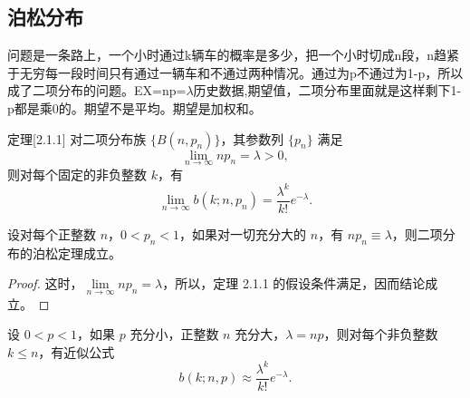 \subsection{泊松分布}
\begin{dxtips}
    问题是一条路上，一个小时通过k辆车的概率是多少，把一个小时切成n段，n趋紧于无穷每一段时间只有通过一辆车和不通过两种情况。通过为p不通过为1-p，所以成了二项分布的问题。EX=np=$\lambda$历史数据,期望值，二项分布里面就是这样剩下1-p都是乘0的。期望不是平均。期望是加权和。
\end{dxtips}
\begin{theorem}[二项分布收敛到泊松分布的极限定理]定理[2.1.1]
对二项分布族 $\{B(n, p_n)\}$，其参数列 $\{p_n\}$ 满足
\[
\lim_{n \to \infty} n p_n = \lambda > 0,
\]
则对每个固定的非负整数 $k$，有
\[
\lim_{n \to \infty} b(k; n, p_n) = \frac{\lambda^k}{k!} e^{-\lambda}.
\]


\end{theorem}
\begin{corollary}[2.1.1]
设对每个正整数 $n$，$0 < p_n < 1$，如果对一切充分大的 $n$，有 $n p_n \equiv \lambda$，则二项分布的泊松定理成立。
\end{corollary}

\begin{proof}
这时，$\lim\limits_{n\to\infty} n p_n = \lambda$，所以，定理 2.1.1 的假设条件满足，因而结论成立。
\end{proof}

\begin{corollary}[2.1.2]
设 $0<p<1$，如果 $p$ 充分小，正整数 $n$ 充分大，$\lambda = np$，则对每个非负整数 $k\leq n$，有近似公式
\[
b(k;n,p)\approx \frac{\lambda^k}{k!} e^{-\lambda}. \tag{2.1.2}
\]
\end{corollary}

